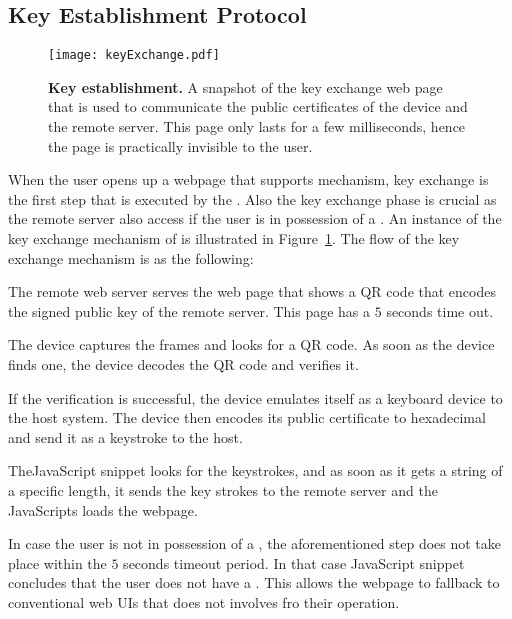 \subsection{Key Establishment Protocol}
\label{sec:systemDesign:keyEstablishment}

\begin{figure}[t]
\centering
\texttt{[image: keyExchange.pdf]}
\caption{\textbf{Key establishment.} A snapshot of the key exchange web page that is used to communicate the public certificates of the device and the remote server. This page only lasts for a few milliseconds, hence the page is practically invisible to the user.}
\label{fig:keyExchange}
\centering
\end{figure}

When the user opens up a webpage that supports \name mechanism, key exchange is the first step that is executed by the \device. Also the key exchange phase is crucial as the remote server also access if the user is in possession of a \device. An instance of the key exchange mechanism of \name is illustrated in Figure~\ref{fig:keyExchange}. The flow of the key exchange mechanism is as the following:

\begin{mylist}
  \item The remote web server serves the web page that shows a QR code that encodes the signed public key of the remote server. This page has a $5$ seconds time out.
  \item The device captures the frames and looks for a QR code. As soon as the device finds one, the device decodes the QR code and verifies it.
  \item If the verification is successful, the device emulates itself as a keyboard device to the host system. The device then encodes its public certificate to hexadecimal and send it as a keystroke to the host.
  \item The\name  JavaScript snippet looks for the keystrokes, and as soon as it gets a string of a specific length, it sends the key strokes to the remote server and the \name JavaScripts loads the webpage.
  \item In case the user is not in possession of a \device, the aforementioned step does not take place within the $5$ seconds timeout period. In that case \name JavaScript snippet concludes that the user does not have a \device. This allows the webpage to fallback to conventional web UIs that does not involves \device fro their operation.
\end{mylist}

